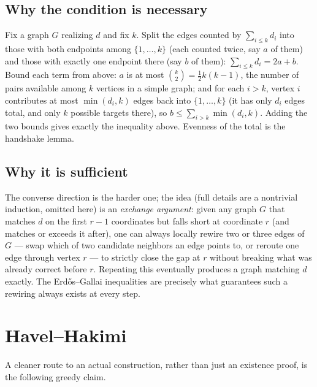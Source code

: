 \documentclass[11pt]{article}
\begin{document}
\subsection{Why the condition is necessary}
Fix a graph $G$ realizing $d$ and fix $k$. Split the edges counted by
$\sum_{i \le k} d_i$ into those with both endpoints among
$\{1, \ldots, k\}$ (each counted twice, say $a$ of them) and those with
exactly one endpoint there (say $b$ of them): $\sum_{i \le k} d_i = 2a +
b$. Bound each term from above: $a$ is at most $\binom{k}{2} =
\tfrac12 k(k-1)$, the number of pairs available among $k$ vertices in a
simple graph; and for each $i > k$, vertex $i$ contributes at most
$\min(d_i, k)$ edges back into $\{1, \ldots, k\}$ (it has only $d_i$ edges
total, and only $k$ possible targets there), so $b \le \sum_{i > k}
\min(d_i, k)$. Adding the two bounds gives exactly the inequality above.
Evenness of the total is the handshake lemma.

\subsection{Why it is sufficient}
The converse direction is the harder one; the idea (full details are a
nontrivial induction, omitted here) is an \emph{exchange argument}: given
any graph $G$ that matches $d$ on the first $r-1$ coordinates but falls
short at coordinate $r$ (and matches or exceeds it after), one can always
locally rewire two or three edges of $G$ --- swap which of two candidate
neighbors an edge points to, or reroute one edge through vertex $r$ --- to
strictly close the gap at $r$ without breaking what was already correct
before $r$. Repeating this eventually produces a graph matching $d$
exactly. The Erd\H{o}s--Gallai inequalities are precisely what guarantees
such a rewiring always exists at every step.

\section{Havel--Hakimi}
A cleaner route to an actual construction, rather than just an existence
proof, is the following greedy claim.
\end{document}
